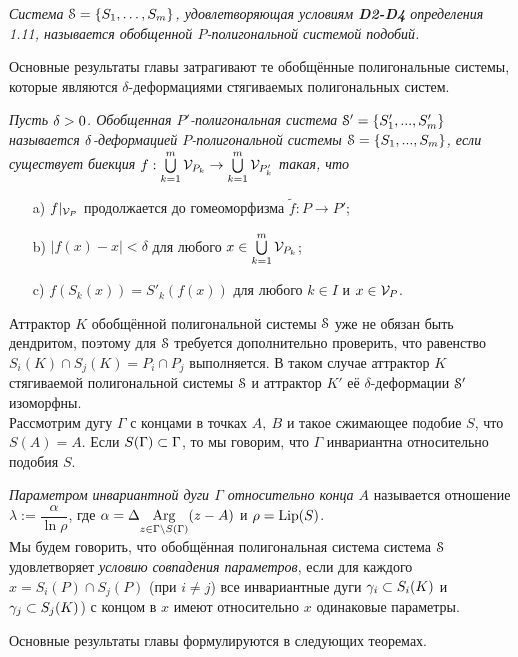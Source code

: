 \documentclass[a5paper,9pt,twoside]{extarticle} %
\begin{document}
{\em  Система ${\EuScript S}=\{S_1,\ldots ,S_m\} $, удовлетворяющая условиям {\bf D2-D4} определения 1.11, называется обобщенной $P$-полигональной системой подобий.}

Основные результаты главы затрагивают те обобщённые полигональные системы, которые являются $\delta$-деформациями стягиваемых полигональных систем.

{\em  Пусть $\delta>0$. Обобщенная $P'$-полигональная система ${\EuScript S}'=\{S'_1,...,S'_m\}$ называется $\delta$-деформацией $P$-полигональной системы ${\EuScript S}=\{S_1,...,S_m\}$, если существует биекция $f:\bigcup\limits_{k=1}^m {\mathcal V}_{P_k}\to \bigcup\limits_{k=1}^m {\mathcal V}_{P'_k}$ такая, что
\begin{itemize}[nolistsep]
    \item[a)] $f|_{{\mathcal V}_P}$ продолжается до гомеоморфизма $\tilde f: P\to  P'$;
    \item[b)] $|f(x)-x|<\delta$  для любого $x\in \bigcup\limits_{k=1}^m {\mathcal V}_{P_k}$;
    \item[c)] $f(S_k(x))=S'_k(f(x))$ для любого $k\in I$ и $x\in {\mathcal V}_P$.
\end{itemize} }

Аттрактор $K$ обобщённой полигональной системы ${\EuScript S}$ уже не обязан быть дендритом, поэтому  для ${\EuScript S}$ требуется дополнительно проверить, что равенство $S_i(K)\cap S_j(K)=P_i\cap P_j$ выполняется.
В таком случае аттрактор $K$ стягиваемой полигональной системы ${\EuScript S}$ и аттрактор $K'$ её $\delta$-деформации ${\EuScript S}'$ изоморфны.\\

Рассмотрим дугу  $\Gamma$ с концами в точках $A,\ B$ и такое сжимающее подобие $S$, что $S(A)=A$.
Если $S(\Gamma)\subset\Gamma$, то мы говорим, что $\Gamma$ инвариантна относительно подобия $S$.

{\em Параметром инвариантной дуги $\Gamma$ относительно конца $A$} называется отношение $\lambda:=\dfrac{\alpha}{\ln\rho}$, где $\alpha=\Delta\underset{{z\in\Gamma\setminus S(\Gamma)}}{\mathrm {Arg}}(z-A)$ и $\rho=\mathop{\rm Lip} \nolimits(S)$.\\

Мы будем говорить, что обобщённая полигональная система система ${\EuScript S}$ удовлетворяет {\em условию совпадения параметров}, если для каждого \linebreak $x=S_i(P)\cap S_j(P)$ (при $i\neq j$) все инвариантные дуги $\gamma_i\subset S_i(K)$ и $\gamma_j\subset S_j(K)$) с концом в $x$ имеют относительно $x$ одинаковые параметры.

Основные результаты главы формулируются в следующих теоремах.\\
\end{document}
